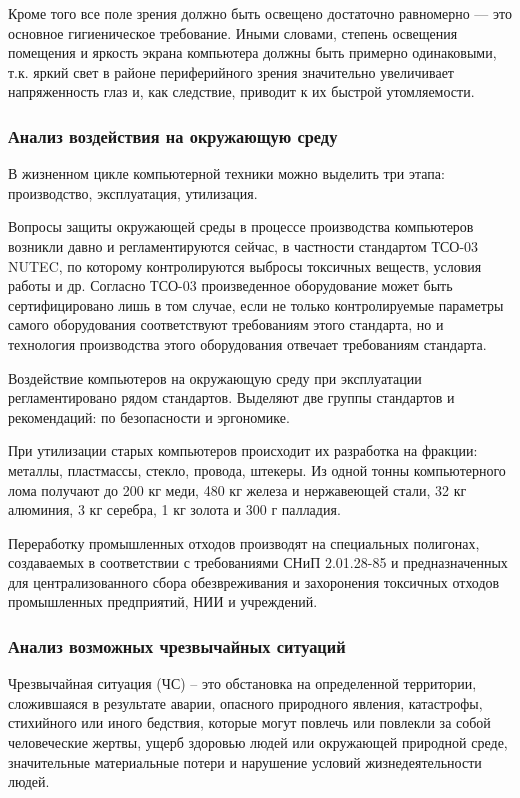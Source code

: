 Кроме того все поле зрения должно быть освещено достаточно равномерно --- это основное гигиеническое требование. Иными словами, степень освещения помещения и яркость экрана компьютера должны быть примерно одинаковыми, т.к. яркий свет в районе периферийного зрения значительно увеличивает напряженность глаз и, как следствие, приводит к их быстрой утомляемости.

\subsubsection{Анализ воздействия на окружающую среду}

В жизненном цикле компьютерной техники можно выделить три этапа: производство, эксплуатация, утилизация.

Вопросы защиты окружающей среды в процессе производства компьютеров возникли давно и регламентируются сейчас, в частности стандартом ТСО-03 NUTEC, по которому контролируются выбросы токсичных веществ, условия работы и др.
Согласно ТСО-03 произведенное оборудование может быть сертифицировано лишь в том случае, если не только контролируемые параметры самого оборудования соответствуют требованиям этого стандарта, но и технология производства этого оборудования отвечает требованиям стандарта.

Воздействие компьютеров на окружающую среду при эксплуатации регламентировано рядом стандартов.
Выделяют две группы стандартов и рекомендаций: по безопасности и эргономике.

При утилизации старых компьютеров происходит их разработка на фракции: металлы, пластмассы, стекло, провода, штекеры.
Из одной тонны компьютерного лома получают до 200 кг меди, 480 кг железа и нержавеющей стали, 32 кг алюминия, 3 кг серебра, 1 кг золота и 300 г палладия.

Переработку промышленных отходов производят на специальных полигонах, создаваемых в соответствии с требованиями СНиП 2.01.28-85 и предназначенных для централизованного сбора обезвреживания и захоронения токсичных отходов промышленных предприятий, НИИ и учреждений.

\subsubsection{Анализ возможных чрезвычайных ситуаций}

Чрезвычайная ситуация (ЧС) – это обстановка на определенной территории, сложившаяся в результате аварии, опасного природного явления, катастрофы, стихийного или иного бедствия, которые могут повлечь или повлекли за собой человеческие жертвы, ущерб здоровью людей или окружающей природной среде, значительные материальные потери и нарушение условий жизнедеятельности людей.

